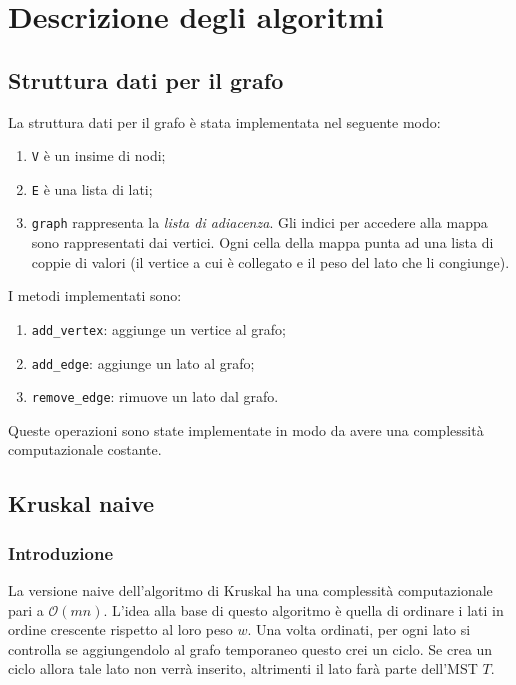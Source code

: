 \section{Descrizione degli algoritmi}

\subsection{Struttura dati per il grafo}

La struttura dati per il grafo è stata implementata nel seguente
modo:
\begin{enumerate}
    \item \verb|V| è un insime di nodi;
    \item \verb|E| è una lista di lati;
    \item \verb|graph| rappresenta la \textit{lista di adiacenza}.
    Gli indici per accedere alla mappa sono rappresentati dai vertici.
    Ogni cella della mappa punta ad una lista di coppie di valori
    (il vertice a cui è collegato e il peso del lato che li
    congiunge).
\end{enumerate}

I metodi implementati sono:
\begin{enumerate}
    \item \verb|add_vertex|: aggiunge un vertice al grafo;
    \item \verb|add_edge|: aggiunge un lato al grafo;
    \item \verb|remove_edge|: rimuove un lato dal grafo.
\end{enumerate}
Queste operazioni sono state implementate in modo da avere una
complessità computazionale costante.

\subsection{Kruskal naive}

\subsubsection{Introduzione}

La versione naive dell'algoritmo di Kruskal ha una complessità
computazionale pari a $\mathcal{O}(mn)$. L'idea alla base di questo
algoritmo è quella di ordinare i lati in ordine crescente rispetto al
loro peso $w$. Una volta ordinati, per ogni lato si controlla se
aggiungendolo al grafo temporaneo questo crei un ciclo. Se crea un
ciclo allora tale lato non verrà inserito, altrimenti il lato farà
parte dell'MST $T$.

